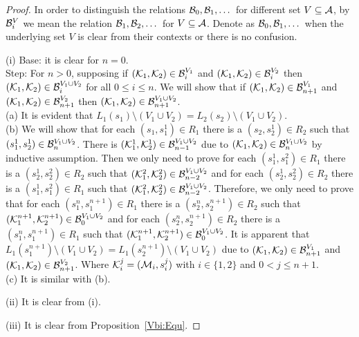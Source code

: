 \documentclass{article}
\begin{document}
\begin{proof}
In order to distinguish the relations ${\cal B}_0, {\cal B}_1, \dots$ for different set $V \subseteq {\cal A}$, by ${\cal B}_i^V$ we mean the relation ${\cal B}_1, {\cal B}_2, \dots$ for $V \subseteq {\cal A}$.
Denote as ${\cal B}_0, {\cal B}_1, \dots$ when the underlying set $V$ is clear from their contexts or there is no confusion.

(i) Base: it is clear for $n = 0$.\\
Step: For $n > 0$, supposing if $({\cal K}_1, {\cal K}_2) \in {\cal B}_i^{V_1}$ and $({\cal K}_1, {\cal K}_2) \in {\cal B}_i^{V_2}$ then $({\cal K}_1, {\cal K}_2) \in {\cal B}_i^{V_1 \cup V_2}$ for all $0 \leq i \leq n$. We will show that if $({\cal K}_1, {\cal K}_2) \in {\cal B}_{n+1}^{V_1}$ and $({\cal K}_1, {\cal K}_2) \in {\cal B}_{n+1}^{V_2}$ then $({\cal K}_1, {\cal K}_2) \in {\cal B}_{n+1}^{V_1 \cup V_2}$.\\
(a) It is evident that $L_1(s_1) \setminus (V_1 \cup V_2) = L_2(s_2) \setminus (V_1\cup V_2)$.\\
(b) We will show that for each $(s_1, s_1^1) \in R_1$ there is a $(s_2, s_2^1) \in R_2$ such that $(s_1^1, s_2^1) \in {\cal B}_n^{V_1 \cup V_2}$. There is $({\cal K}_1^1, {\cal K}_2^1) \in {\cal B}_{n-1}^{V_1 \cup V_2}$
due to $({\cal K}_1, {\cal K}_2) \in {\cal B}_n^{V_1 \cup V_2}$ by inductive assumption. Then we only need to prove for each $(s_1^1, s_1^2) \in R_1$ there is a $(s_2^1, s_2^2) \in R_2$ such that $({\cal K}_1^2, {\cal K}_2^2) \in {\cal B}_{n-2}^{V_1 \cup V_2}$ and for each $(s_2^1, s_2^2) \in R_2$ there is a $(s_1^1, s_1^2) \in R_1$ such that $({\cal K}_1^2, {\cal K}_2^2) \in {\cal B}_{n-2}^{V_1 \cup V_2}$. Therefore, we only need to prove that for each $(s_1^n, s_1^{n+1}) \in R_1$ there is a $(s_2^n, s_2^{n+1}) \in R_2$ such that $({\cal K}_1^{n+1}, {\cal K}_2^{n+1}) \in {\cal B}_0^{V_1 \cup V_2}$ and for each $(s_2^n, s_2^{n+1}) \in R_2$ there is a $(s_1^n, s_1^{n+1}) \in R_1$ such that $({\cal K}_1^{n+1}, {\cal K}_2^{n+1}) \in {\cal B}_0^{V_1 \cup V_2}$. It is apparent that $L_1(s_1^{n+1}) \setminus (V_1 \cup V_2) = L_1(s_2^{n+1}) \setminus (V_1 \cup V_2)$ due to $({\cal K}_1, {\cal K}_2) \in {\cal B}_{n+1}^{V_1}$ and $({\cal K}_1, {\cal K}_2) \in {\cal B}_{n+1}^{V_2}$.
Where ${\cal K}_i^j = ({\cal M}_i, s_i^j)$ with $i \in \{1, 2\}$ and $0 < j \leq n+1$.\\
(c) It is similar with (b).

(ii) It is clear from (i).

(iii) It is clear from Proposition~\ref{Vbi:Equ}.


\end{proof}
\end{document}
